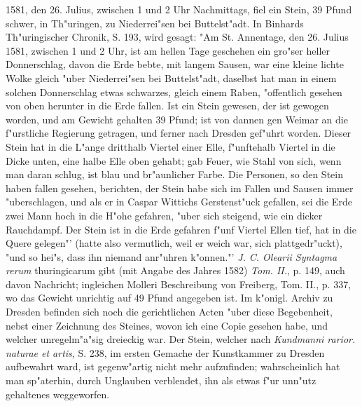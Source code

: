 \documentclass[a4paper, 11pt, oneside, polutonikogreek, german]{article}
\begin{document}
1581, den 26. Julius, zwischen 1 und 2 Uhr Nachmittags, fiel ein Stein, 39 Pfund schwer, in Th"uringen, zu Niederrei"sen bei Buttelst"adt. In Binhards Th"uringischer Chronik, S. 193, wird gesagt: "Am St. Annentage, den 26. Julius 1581, zwischen 1 und 2 Uhr, ist am hellen Tage geschehen ein gro"ser heller Donnerschlag, davon die Erde bebte, mit langem Sausen, war eine kleine lichte Wolke gleich "uber Niederrei"sen bei Buttelst"adt, daselbst hat man in einem solchen Donnerschlag etwas schwarzes, gleich einem Raben, "offentlich gesehen von oben herunter in die Erde fallen. Ist ein Stein gewesen, der ist gewogen worden, und am Gewicht gehalten 39 Pfund; ist von dannen gen Weimar an die f"urstliche Regierung getragen, und ferner nach Dresden gef"uhrt worden. Dieser Stein hat in die L"ange dritthalb Viertel einer Elle, f"unftehalb Viertel in die Dicke unten, eine halbe Elle oben gehabt; gab Feuer, wie Stahl von sich, wenn man daran schlug, ist blau und br"aunlicher Farbe. Die Personen, so den Stein haben fallen gesehen, berichten, der Stein habe sich im Fallen und Sausen immer "uberschlagen, und als er in Caspar Wittichs Gerstenst"uck gefallen, sei die Erde zwei Mann hoch in die H"ohe gefahren, "uber sich steigend, wie ein dicker Rauchdampf. Der Stein ist in die Erde gefahren f"unf Viertel Ellen tief, hat in die Quere gelegen"' (hatte also vermutlich, weil er weich war, sich plattgedr"uckt), "und so hei"s, dass ihn niemand anr"uhren k"onnen."' \emph{J. C. Olearii Syntagma rerum} thuringicarum gibt (mit Angabe des Jahres 1582) \emph{Tom. II.}, p. 149, auch davon Nachricht; ingleichen Molleri Beschreibung von Freiberg, Tom. II., p. 337, wo das Gewicht unrichtig auf 49 Pfund angegeben ist. Im k"onigl. Archiv zu Dresden befinden sich noch die gerichtlichen Acten "uber diese Begebenheit, nebst einer Zeichnung des Steines, wovon ich eine Copie gesehen habe, und welcher unregelm"a"sig dreieckig war. Der Stein, welcher nach \emph{Kundmanni rarior. naturae et artis}, S. 238, im ersten Gemache der Kunstkammer zu Dresden aufbewahrt ward, ist gegenw"artig nicht mehr aufzufinden; wahrscheinlich hat man sp"aterhin, durch Unglauben verblendet, ihn als etwas f"ur unn"utz gehaltenes weggeworfen.
\end{document}

